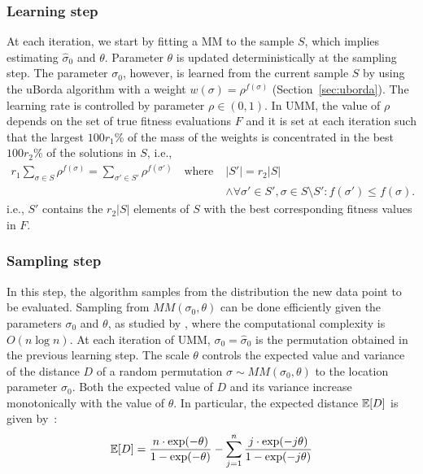 \documentclass[runningheads]{llncs}
\begin{document}
\subsubsection{Learning step}
%
At each iteration, we start by fitting a MM to the sample $S$, which implies
estimating $\hat\sigma_0$ and $\theta$. Parameter $\theta$ is updated
deterministically at the sampling step.  The parameter $\sigma_0$, however, is
learned from the current sample $S$ by using the uBorda algorithm with a weight
$w(\sigma)=\rho^{f(\sigma)}$ (Section~\ref{sec:uborda}). The learning rate is
controlled by parameter $\rho \in (0,1)$. %
In UMM, the value of $\rho$ depends on the set of true fitness evaluations $F$
and it is set at each iteration such that the largest $100r_1$\% of the mass of
the weights is concentrated in the best $100r_2$\% of the solutions in $S$, i.e.,
%
\begin{equation}
  \begin{split}
  r_1 \sum_{\sigma\in S}\rho^{f(\sigma)} =  \sum_{\sigma'\in S'}\rho^{f(\sigma')} \quad\text{where}\; &|S'| = r_2|S| \\[-1.2em]
  &\land \forall \sigma'\in S', \sigma\in S\setminus S' : f(\sigma')\leq f(\sigma).
  \end{split}
\end{equation}
%
i.e., $S'$ contains the $r_2|S|$ elements of $S$ with the best corresponding fitness values in $F$. %



\subsubsection{Sampling step}\label{sec:sampling}
In this step, the algorithm samples from the distribution the new data point to be evaluated. 
Sampling from $MM(\sigma_0,\theta)$  can be done efficiently given the parameters  $\sigma_0$ and $\theta$, as studied by \citet{IruCalLoz2016permallows}, where the computational complexity is $O(n\log n)$. %
%
At each iteration of UMM, $\sigma_0=\hat\sigma_0$ is the permutation obtained in the previous learning step. The scale $\theta$ controls the expected value and variance of the distance $D$ of a random permutation $\sigma\sim MM(\sigma_0, \theta)$ to the location parameter $\sigma_0$. Both  the expected value of $D$ and its variance increase monotonically with the value of $\theta$. In particular, the expected distance $\mathbb{E}[D]$ is given by~\cite{FliVer1986}:
%
\begin{equation}\label{eq:expectation}
\mathbb{E}[D] = \frac{n \cdot \exp(-\theta)}{1-\exp(-\theta)} - \sum_{j=1}^{n}  \frac{j\cdot\exp(-j  \theta)}{1-\exp(-j\theta)}
\end{equation}
\end{document}
